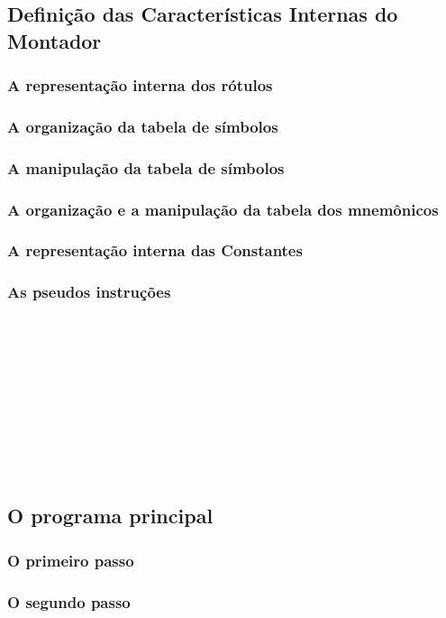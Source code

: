 \documentclass[a4paper,12pt]{article}
\begin{document}
\subsection{Definição das Características Internas do Montador}

\subsubsection{A representação interna dos rótulos}
\subsubsection{A organização da tabela de símbolos}
\subsubsection{A manipulação da tabela de símbolos}
\subsubsection{A organização e a manipulação da tabela dos mnemônicos}
\subsubsection{A representação interna das Constantes}
\subsubsection{As pseudos instruções}
\\
\\
\\
\\
\\
\\
\\
\\
\\

\subsection{O programa principal}
\subsubsection{O primeiro passo}

\subsubsection{O segundo passo}
\end{document}
